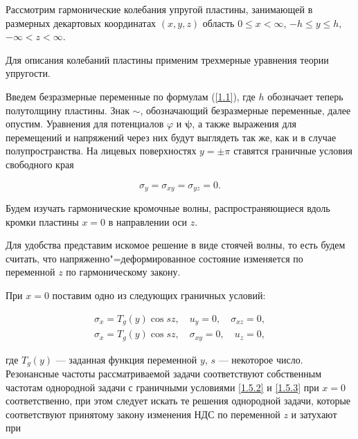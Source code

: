 \smallskip




Рассмотрим гармонические колебания упругой пластины, занимающей в размерных декартовых координатах $(x,y,z)$ область $ 0\leqslant x<\infty$, $-h \leqslant y \leqslant h ,$ $ -\infty < z < \infty $. 

Для описания колебаний пластины применим трехмерные уравнения теории упругости. 

Введем безразмерные переменные по формулам (\ref{1.1}), где $h$ обозначает теперь полутолщину пластины. Знак \guillemotleft$\sim$\guillemotright, обозначающий безразмерные переменные, далее опустим. Уравнения для потенциалов $\varphi$ и $\boldsymbol{\psi}$, а также выражения для перемещений и напряжений через них будут выглядеть так же, как и в случае полупространства. На лицевых поверхностях $y=\pm\pi$ ставятся граничные условия свободного края

\begin{equation}

\label{2.1}

 \sigma_y=\sigma_{xy}=\sigma_{yz}=0.

\end{equation}

Будем изучать гармонические кромочные волны, распространяющиеся вдоль кромки пластины $x=0$ в направлении оси $z$. 

Для удобства представим искомое решение в виде стоячей волны, то есть будем считать, что напряженно"=деформированное состояние изменяется по переменной $z$ по гармоническому закону. 

При $x=0$ поставим одно из следующих граничных условий:

\begin{gather}

\sigma_x=T_g(y)\cos{sz},\quad  u_y = 0, \quad  \sigma_{xz}=0, \label{2.2a} \\

\sigma_x=T_g(y)\cos{sz},\quad \sigma_{xy} = 0,\quad  u_z=0, \label{2.2b}

\end{gather}

где $T_g(y)$ --- заданная функция переменной $y$, $s$ --- некоторое число. Резонансные частоты рассматриваемой задачи соответствуют собственным частотам однородной задачи с граничными условиями \eqref{1.5.2} и \eqref{1.5.3} при $x=0$ соответственно, при этом следует искать те решения однородной задачи, которые соответствуют принятому закону изменения НДС по переменной $z$ и затухают при

